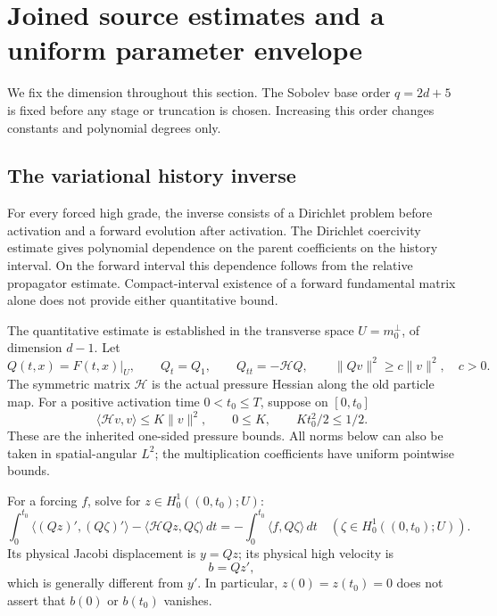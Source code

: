 \section{Joined source estimates and a uniform parameter envelope}
\label{sec:parameter-envelope}

We fix the dimension throughout this section. The Sobolev base order
$q=2d+5$ is fixed before any stage or truncation is chosen. Increasing this
order changes constants and polynomial degrees only.

\subsection{The variational history inverse}

For every forced high grade, the inverse consists of a Dirichlet problem
before activation and a forward evolution after activation. The Dirichlet
coercivity estimate gives polynomial dependence on the parent coefficients
on the history interval. On the forward interval this dependence follows
from the relative propagator estimate. Compact-interval existence of a
forward fundamental matrix alone does not provide either quantitative bound.

The quantitative estimate is established in the transverse space
$U=m_0^\perp$, of dimension $d-1$. Let
\[
 Q(t,x)=F(t,x)|_U,\qquad Q_t=Q_1,\qquad
 Q_{tt}=-\mathcal H Q,\qquad
 \|Qv\|^2\geq c\|v\|^2,\quad c>0.
\]
The symmetric matrix $\mathcal H$ is the actual pressure Hessian along
the old particle map. For a positive activation time $0<t_0\leq T$, suppose on $[0,t_0]$
\[
 \langle\mathcal H v,v\rangle\leq K\|v\|^2,\qquad
 0\leq K,\qquad Kt_0^2/2\leq1/2.
\]
These are the inherited one-sided pressure bounds. All norms below can
also be taken in spatial-angular $L^2$; the multiplication coefficients
have uniform pointwise bounds.

For a forcing $f$, solve for $z\in H^1_0((0,t_0);U)$:
\begin{equation}\label{eq:joined-history-form}
 \int_0^{t_0}\!
 \big\langle(Qz)',(Q\zeta)'\big\rangle
 -\big\langle\mathcal H Qz,Q\zeta\big\rangle\,dt
 =-\int_0^{t_0}\langle f,Q\zeta\rangle\,dt
 \quad(\zeta\in H^1_0((0,t_0);U)).
\end{equation}
Its physical Jacobi displacement is $y=Qz$; its physical high velocity is
\begin{equation}\label{eq:joined-history-high}
 b=Qz',
\end{equation}
which is generally different from $y'$. In particular, $z(0)=z(t_0)=0$
does not assert that $b(0)$ or $b(t_0)$ vanishes.

